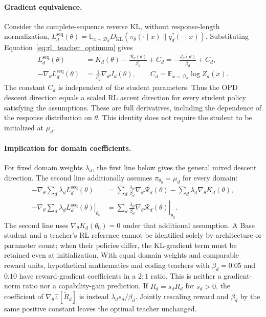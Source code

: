 \paragraph{Gradient equivalence.}
Consider the complete-sequence reverse KL, without response-length
normalization,
$L_d^{\mathrm{seq}}(\theta)=\mathbb E_{x\sim\mathcal D_d}
D_{\mathrm{KL}}(\pi_\theta(\cdot\mid x)\|q_d^*(\cdot\mid x))$.
Substituting Equation~\ref{eq:rl_teacher_optimum} gives
\begin{equation}
\begin{aligned}
L_d^{\mathrm{seq}}(\theta)
&=K_d(\theta)-\frac{\mathcal R_d(\theta)}{\beta_d}+C_d
=-\frac{J_d(\theta)}{\beta_d}+C_d,\\
-\nabla_\theta L_d^{\mathrm{seq}}(\theta)
&=\frac{1}{\beta_d}\nabla_\theta J_d(\theta),
\qquad C_d=\mathbb E_{x\sim\mathcal D_d}\log Z_d(x).
\end{aligned}
\label{eq:rl_teacher_gradient}
\end{equation}
The constant $C_d$ is independent of the student parameters. Thus the
OPD descent direction equals a scaled RL ascent direction for every
student policy satisfying the assumptions. These are full derivatives,
including the dependence of the response distribution on $\theta$.
This identity does not require the student to be initialized at $\mu_d$.

\paragraph{Implication for domain coefficients.}
For fixed domain weights $\lambda_d$, the first line below gives the
general mixed descent direction. The second line additionally assumes
$\pi_{\theta_0}=\mu_d$ for every domain:
\begin{equation}
\begin{aligned}
-\nabla_\theta\sum_d\lambda_d L_d^{\mathrm{seq}}(\theta)
&=\sum_d\frac{\lambda_d}{\beta_d}\nabla_\theta\mathcal R_d(\theta)
  -\sum_d\lambda_d\nabla_\theta K_d(\theta),\\
\left.-\nabla_\theta\sum_d\lambda_d L_d^{\mathrm{seq}}(\theta)
\right|_{\theta_0}
&=\left.\sum_d\frac{\lambda_d}{\beta_d}
  \nabla_\theta\mathcal R_d(\theta)\right|_{\theta_0}.
\end{aligned}
\label{eq:rl_teacher_mixture}
\end{equation}
The second line uses $\nabla_\theta K_d(\theta_0)=0$ under that additional
assumption. A Base student and a teacher's RL reference cannot be
identified solely by architecture or parameter count; when their
policies differ, the KL-gradient term must be retained even at
initialization. With equal domain weights and comparable reward units,
hypothetical mathematics and coding teachers with $\beta_d=0.05$ and
$0.10$ have reward-gradient coefficients in a $2{:}1$ ratio. This is
neither a gradient-norm ratio nor a capability-gain prediction.
If $R_d=s_d\widetilde R_d$ for $s_d>0$, the coefficient of
$\nabla_\theta\mathbb E[\widetilde R_d]$ is instead
$\lambda_d s_d/\beta_d$. Jointly rescaling reward and $\beta_d$ by the
same positive constant leaves the optimal teacher unchanged.


